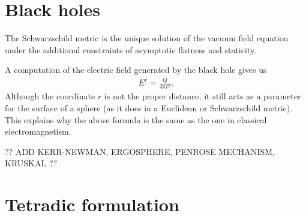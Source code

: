 \section{Black holes}


    \begin{theorem}[Birkhoff]
        The Schwarzschild metric is the unique solution of the vacuum field equation under the additional constraints of asymptotic flatness and staticity.
    \end{theorem}


    \begin{remark}
        A computation of the electric field generated by the black hole gives us
        \begin{gather}
            E^r = \frac{Q}{4\pi r^2}.
        \end{gather}
        Although the coordinate $r$ is not the proper distance, it still acts as a parameter for the surface of a sphere (as it does in a Euclidean or Schwarzschild metric). This explains why the above formula is the same as the one in classical electromagnetism.
    \end{remark}

    ?? ADD KERR-NEWMAN, ERGOSPHERE, PENROSE MECHANISM, KRUSKAL ??

\section{Tetradic formulation}


